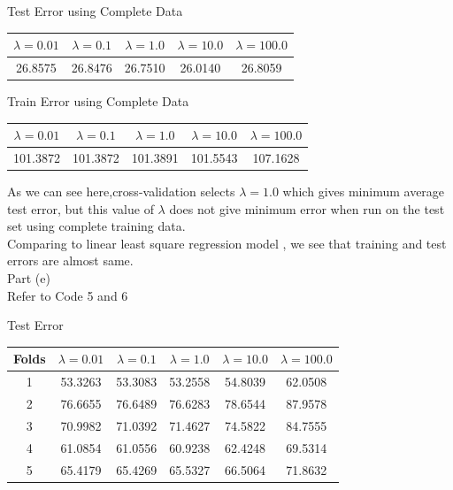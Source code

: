 \documentclass[twoside,10pt,a4paper]{article}
\theoremstyle{definition}
\theoremstyle{definition}
\theoremstyle{remark}
\renewcommand{\>}{{\rightarrow}}
\newcommand{\1}{{\mathbf 1}}
\newcommand{\0}{{\mathbf 0}}
\begin{document}
Test Error using Complete Data
\begin{center}
\begin{tabular}{| c| c | c | c | c|}
\hline
   $\lambda = 0.01$ & $\lambda = 0.1$ & $\lambda = 1.0 $ & $\lambda = 10.0$& $\lambda = 100.0$\\
\hline
26.8575 & 26.8476 &  26.7510 &  26.0140 &  26.8059 \\
\hline
\end{tabular}
\end{center}
Train Error using Complete Data
\begin{center}
\begin{tabular}{| c| c | c | c | c|}
\hline
   $\lambda = 0.01$ & $\lambda = 0.1$ & $\lambda = 1.0 $ & $\lambda = 10.0$& $\lambda = 100.0$\\
\hline
101.3872 &  101.3872 &  101.3891 & 101.5543 & 107.1628 \\
\hline
\end{tabular}
\end{center}

As we can see here,cross-validation selects $\lambda = 1.0$ which gives minimum average test error, but this value of $\lambda$
does not give minimum error when run on the test set using complete training data. \\

Comparing to linear least square regression model , we see that training and test errors are almost same.\\

Part (e) \\
Refer to Code 5 and 6

Test Error \\

\begin{center}
\begin{tabular}{|c| c| c | c | c | c|}
\hline
  Folds & $\lambda = 0.01$ & $\lambda = 0.1$ & $\lambda = 1.0 $ & $\lambda = 10.0$& $\lambda = 100.0$\\
\hline


1 & 53.3263 &  53.3083 &  53.2558 &  54.8039  & 62.0508 \\
\hline
2 & 76.6655 &  76.6489 &  76.6283 &  78.6544  & 87.9578 \\
\hline
3 & 70.9982 &  71.0392 &  71.4627 &  74.5822 &  84.7555 \\
\hline
4 & 61.0854 &  61.0556 &  60.9238 &  62.4248 &  69.5314 \\
\hline
5 & 65.4179 & 65.4269 &  65.5327  & 66.5064 &  71.8632 \\
\hline
\end{tabular}
\end{center}
\end{document}
